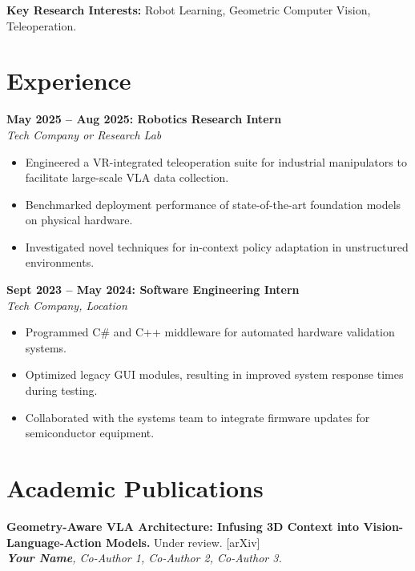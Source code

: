 \documentclass[11pt,a4paper]{article}
\newcommand{\blueitem}[1]{\textcolor{subtitleblue}{\textbf{#1}}}
\begin{document}
\vspace{0.2em}
\textbf{Key Research Interests:} Robot Learning, Geometric Computer Vision, Teleoperation.

\section*{Experience}

\blueitem{May 2025 -- Aug 2025: Robotics Research Intern} \\
\textit{Tech Company or Research Lab}
\begin{itemize}
    \item Engineered a VR-integrated teleoperation suite for industrial manipulators to facilitate large-scale VLA data collection.
    \item Benchmarked deployment performance of state-of-the-art foundation models on physical hardware.
    \item Investigated novel techniques for in-context policy adaptation in unstructured environments.
\end{itemize}

\vspace{0.3em}

\blueitem{Sept 2023 -- May 2024: Software Engineering Intern} \\
\textit{Tech Company, Location}
\begin{itemize}
    \item Programmed C\# and C++ middleware for automated hardware validation systems.
    \item Optimized legacy GUI modules, resulting in improved system response times during testing.
    \item Collaborated with the systems team to integrate firmware updates for semiconductor equipment.
\end{itemize}

\section*{Academic Publications}

\blueitem{Geometry-Aware VLA Architecture: Infusing 3D Context into Vision-Language-Action Models.} Under review. [arXiv] \\
\textit{\textbf{Your Name}, Co-Author 1, Co-Author 2, Co-Author 3.}

\vspace{0.2em}
\end{document}
